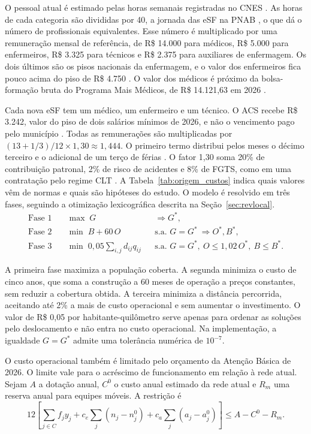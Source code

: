 \documentclass[12pt,a4paper,oneside]{report}
\begin{document}
O pessoal atual é estimado pelas horas semanais registradas no CNES \citep{cnes2026}. As horas de cada
categoria são divididas por 40, a jornada das eSF na PNAB \citep{pnab2017}, o que dá o número de
profissionais equivalentes. Esse número é multiplicado por uma remuneração mensal de referência, de R\$ 14.000 para médicos, R\$ 5.000 para enfermeiros, R\$ 3.325 para
técnicos e R\$ 2.375 para auxiliares de enfermagem. Os dois últimos são os pisos nacionais da enfermagem, e
o valor dos enfermeiros fica pouco acima do piso de R\$ 4.750 \citep{brasil2022piso}. O valor dos médicos é
próximo da bolsa-formação bruta do Programa Mais Médicos, de R\$ 14.121,63 em 2026 \citep{maismedicos2026}.

Cada nova eSF tem um médico, um enfermeiro e um técnico. O ACS recebe R\$ 3.242, valor do piso de dois
salários mínimos de 2026, e não o vencimento pago pelo município \citep{brasil2022,brasil2025sm}. Todas
as remunerações são multiplicadas por $(13+1/3)/12\times1{,}30\approx1{,}444$. O primeiro termo
distribui pelos meses o décimo terceiro e o adicional de um terço de férias
\citep{brasil1962decimo,brasil1988cf}. O fator 1,30 soma 20\% de contribuição patronal, 2\% de risco de
acidentes e 8\% de FGTS, como em uma contratação pelo regime CLT \citep{brasil1991custeio,brasil1990fgts}.
A Tabela~\ref{tab:origem_custos} indica quais valores vêm de normas e quais são hipóteses do estudo.
O modelo é resolvido em três fases, seguindo a otimização lexicográfica descrita na Seção~\ref{sec:revlocal}.
\begin{align}
\text{Fase 1}\quad&\max\;G &&\Rightarrow G^*,\\
\text{Fase 2}\quad&\min\;B+60\,O &&\text{s.a. }G=G^*\ \Rightarrow O^*,B^*,\\
\text{Fase 3}\quad&\min\;0{,}05\sum_{i,j}d_{ij}q_{ij}
&&\text{s.a. }G=G^*,\ O\leq1{,}02\,O^*,\ B\leq B^*.
\end{align}

A primeira fase maximiza a população coberta. A segunda minimiza o custo de cinco anos, que soma a
construção a 60 meses de operação a preços constantes, sem reduzir a cobertura obtida. A terceira
minimiza a distância percorrida, aceitando até 2\% a mais de custo operacional e sem aumentar o
investimento. O valor de R\$ 0,05 por habitante-quilômetro serve apenas para ordenar
as soluções pelo deslocamento e não entra no custo operacional. Na implementação, a igualdade $G=G^*$
admite uma tolerância numérica de $10^{-7}$.

O custo operacional também é limitado pelo orçamento da Atenção Básica de 2026. O limite vale para o
acréscimo de funcionamento em relação à rede atual. Sejam $A$ a dotação anual, $C^0$ o custo anual
estimado da rede atual e $R_m$ uma reserva anual para equipes móveis. A restrição é
\begin{equation}
12\left[\sum_{j\in C}f_jy_j+c_e\sum_j(n_j-n_j^0)+c_a\sum_j(a_j-a_j^0)\right]
\leq A-C^0-R_m.
\end{equation}
\end{document}
